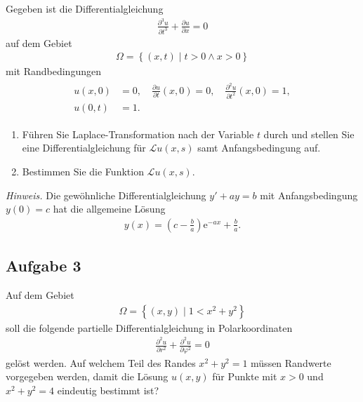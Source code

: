 \documentclass[
	final,
	a4paper,
	oneside,
	parskip=full,
	headings=standardclasses,
	headings=big,
	pointednumbers
]{scrartcl}
\begin{document}
    Gegeben ist die Differentialgleichung
    \begin{align}
        \frac{\partial^3 u}{\partial t^3} + \frac{\partial u}{\partial x} = 0
    \end{align}
    auf dem Gebiet
    \begin{align*}
        \Omega = \left\{\left(x, t\right) \mid t > 0 \land x > 0 \right\}
    \end{align*}
    mit Randbedingungen
    \begin{align}
        \begin{split}
            u{\left(x,  0\right)} &= 0, \quad 
                \frac{\partial u}{\partial t}{\left(x,  0\right)} = 0, \quad 
                \frac{\partial^2 u}{\partial t^2}{\left(x,  0\right)} = 1, \\
            u{\left(0,  t\right)} &= 1.
        \end{split}
    \end{align}
    \begin{enumerate}
        \item Führen Sie Laplace-Transformation nach der Variable $t$ durch und stellen Sie
              eine Differentialgleichung für $\mathcal{L} u{\left( x, s \right)}$ samt
              Anfangsbedingung auf.
        \item Bestimmen Sie die Funktion $\mathcal{L} u{\left( x, s \right)}$.
    \end{enumerate}
    \textit{Hinweis.} \quad Die gewöhnliche Differentialgleichung $y' + ay = b$ mit Anfangsbedingung $y \left(0\right) = c$ hat die allgemeine Lösung
    \begin{align*}
        y \left(x\right) = \left( c - \frac{b}{a} \right) \mathrm{e}^{-ax} + \frac{b}{a}.
    \end{align*}

    \newpage
    
	\subsection*{Aufgabe 3}

    Auf dem Gebiet
    \begin{align*}
        \Omega = \left\{\left(x, y\right) \mid 1 < x^2 + y^2 \right\}
    \end{align*}
    soll die folgende partielle Differentialgleichung in Polarkoordinaten
    \begin{align}
        \frac{\partial^2 u}{\partial r^2} + \frac{\partial^2 u}{\partial \varphi^2} = 0
    \end{align}
    gelöst werden. Auf welchem Teil des Randes $x^2 + y^2 = 1$ müssen Randwerte vorgegeben werden,
    damit die Lösung $u{\left(x,  y\right)}$ für Punkte mit $x > 0$ und $x^2 + y^2 = 4$ eindeutig bestimmt ist?
\end{document}
